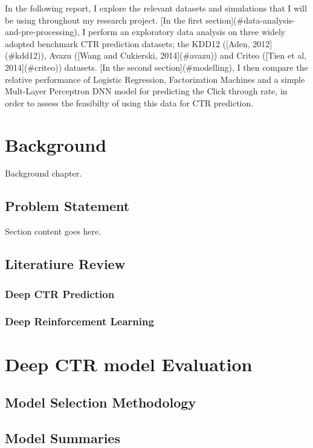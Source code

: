\documentclass{mldsmsc}
\begin{document}
In the following report, I explore the relevant datasets and simulations that I will be using throughout my research project. 
[In the first section](#data-analysis-and-pre-processing), I perform an exploratory data analysis on three widely adopted benchmark CTR 
prediction datasets; the KDD12 ([Aden, 2012](#kdd12)), Avazu ([Wang and Cukierski, 2014](#avazu)) and Criteo ([Tien et al, 2014](#criteo)) datasets. 
[In the second section](#modelling), I then compare the relative performance of Logistic Regression, Factorization Machines and a simple Mult-Layer 
Perceptron DNN model for predicting the Click through rate, in order to assess the feasibilty of using this data for CTR prediction.

\chapter{Background}

Background chapter.

\section{Problem Statement}

Section content goes here. 

\section{Literatiure Review}

\subsection{Deep CTR Prediction}

\subsection{Deep Reinforcement Learning}

\chapter{Deep CTR model Evaluation}

\section{Model Selection Methodology}

\section{Model Summaries}
\end{document}
